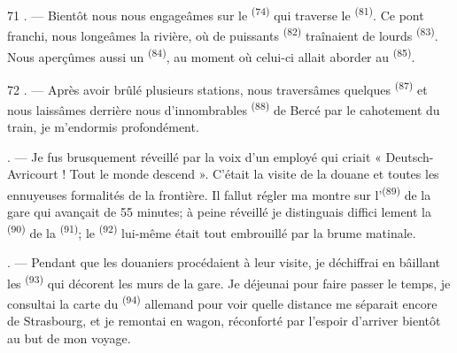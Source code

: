 \begin{VUpage}[73]{71}
. --- Bientôt nous nous engageâmes sur le \nl
{}\textsuperscript{(74)} qui traverse le \textsuperscript{(81)}. Ce pont franchi,\nl
nous longeâmes la rivière, où de puissants \cc
{}\textsuperscript{(82)} traînaient de lourds \textsuperscript{(83)}. Nous\nl
aperçûmes aussi un \textsuperscript{(84)}, au\nl
moment où celui-ci allait aborder au \textsuperscript{(85)}.
\end{VUpage}

\begin{VUpage}[74]{72}
. --- Après avoir brûlé plusieurs stations, nous\nl
traversâmes quelques \textsuperscript{(87)} et nous laissâmes\nl
derrière nous d'innombrables \textsuperscript{(88)} de\nl
{} Bercé par le cahotement du\nl
train, je m'endormis profondément.

. --- Je fus brusquement réveillé par la voix d'un\nl
employé qui criait « Deutsch-Avricourt ! Tout le monde\nl
descend ». C'était la visite de la douane et toutes les\nl
ennuyeuses formalités de la frontière. Il fallut régler\nl
ma montre sur l'\textsuperscript{(89)} de la gare qui avançait\nl
de 55 minutes; à peine réveillé je distinguais diffici\cc
lement la \textsuperscript{(90)} de la \textsuperscript{(91)}; le\nl
{}\textsuperscript{(92)} lui-même était tout embrouillé par la\nl
brume matinale.

. --- Pendant que les douaniers procédaient à leur\nl
visite, je déchiffrai en bâillant les \textsuperscript{(93)} qui\nl
décorent les murs de la gare. Je déjeunai pour faire\nl
passer le temps, je consultai la carte du \textsuperscript{(94)}\nl
allemand pour voir quelle distance me séparait encore\nl
de Strasbourg, et je remontai en wagon, réconforté\nl
par l'espoir d'arriver bientôt au but de mon voyage.

\VUsaut{6.0mm}
\VUfilet{22mm}
\end{VUpage}

